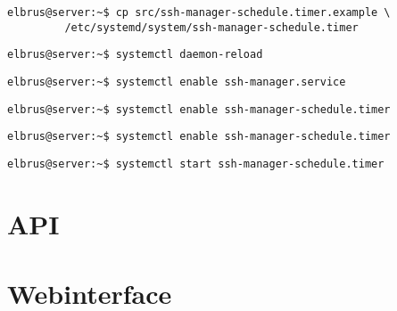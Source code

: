 \documentclass{article}
\begin{document}
	\begin{lstlisting}[caption={Kopieren des Zeitplanungsprogrammes.}]
		elbrus@server:~$ cp src/ssh-manager-schedule.timer.example \
		 /etc/systemd/system/ssh-manager-schedule.timer
	\end{lstlisting}

	\begin{lstlisting}[caption={Neuladen des 'systemctl' Deamons}]
		elbrus@server:~$ systemctl daemon-reload
	\end{lstlisting}

	\begin{lstlisting}[caption={Aktivieren des Serviceprogrammes}]
		elbrus@server:~$ systemctl enable ssh-manager.service
	\end{lstlisting}

	\begin{lstlisting}[caption={Aktivieren des Zeitplanungsprogrammes}]
		elbrus@server:~$ systemctl enable ssh-manager-schedule.timer
	\end{lstlisting}

	\begin{lstlisting}[caption={Aktivieren des Zeitplanungsprogrammes}]
		elbrus@server:~$ systemctl enable ssh-manager-schedule.timer
	\end{lstlisting}

	\begin{lstlisting}[caption={Starten des Zeitplanungsprogrammes}]
		elbrus@server:~$ systemctl start ssh-manager-schedule.timer
	\end{lstlisting}
	\newpage
	
	\section{API}
	\newpage
	
	\section{Webinterface}
	\newpage
\end{document}

